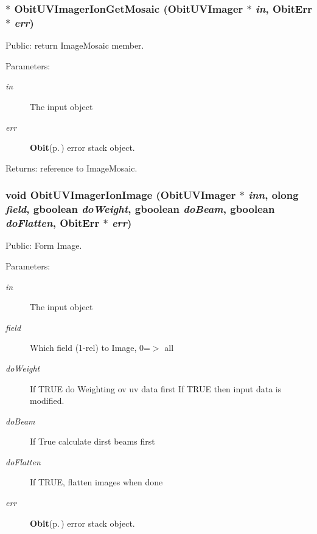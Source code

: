 \subsubsection{$\ast$ Obit\-UVImager\-Ion\-Get\-Mosaic ({\bf Obit\-UVImager} $\ast$ {\em in}, {\bf Obit\-Err} $\ast$ {\em err})}\label{ObitUVImagerIon_8c_a16}


Public: return Image\-Mosaic member. 

\begin{Desc}
\item[Parameters:]
\begin{description}
\item[{\em in}]The input object \item[{\em err}]{\bf Obit}{\rm (p.\,\pageref{structObit})} error stack object. \end{description}
\end{Desc}
\begin{Desc}
\item[Returns:]reference to Image\-Mosaic. \end{Desc}
\subsubsection{\setlength{\rightskip}{0pt plus 5cm}void Obit\-UVImager\-Ion\-Image ({\bf Obit\-UVImager} $\ast$ {\em inn}, {\bf olong} {\em field}, gboolean {\em do\-Weight}, gboolean {\em do\-Beam}, gboolean {\em do\-Flatten}, {\bf Obit\-Err} $\ast$ {\em err})}\label{ObitUVImagerIon_8c_a14}


Public: Form Image. 

\begin{Desc}
\item[Parameters:]
\begin{description}
\item[{\em in}]The input object \item[{\em field}]Which field (1-rel) to Image, 0=$>$ all \item[{\em do\-Weight}]If TRUE do Weighting ov uv data first If TRUE then input data is modified. \item[{\em do\-Beam}]If True calculate dirst beams first \item[{\em do\-Flatten}]If TRUE, flatten images when done \item[{\em err}]{\bf Obit}{\rm (p.\,\pageref{structObit})} error stack object. \end{description}
\end{Desc}
